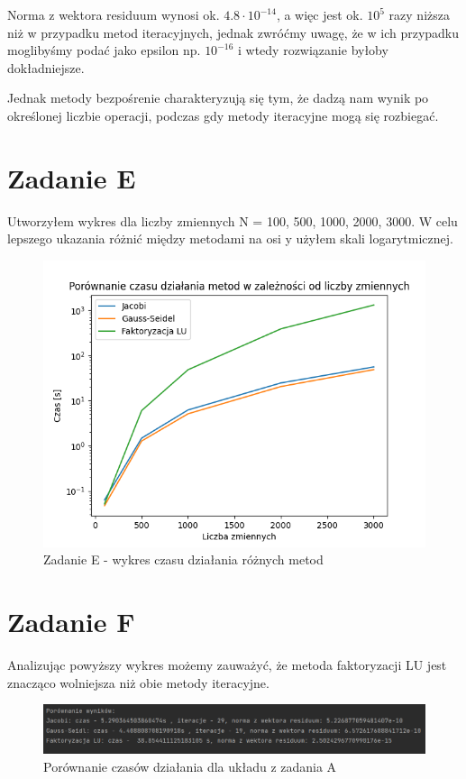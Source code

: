 \documentclass[fleqn]{article}
\begin{document}
    \noindent Norma z wektora residuum wynosi ok. $4.8 \cdot 10^{-14} $, 
    a więc jest ok. $10^5 $ razy niższa niż w przypadku metod iteracyjnych, jednak zwróćmy uwagę,
    że w ich przypadku moglibyśmy podać jako epsilon np. $10^{-16}$ i wtedy rozwiązanie byłoby dokładniejsze.
    
    \noindent Jednak metody bezpośrenie charakteryzują się tym, że dadzą nam wynik po określonej liczbie operacji,
    podczas gdy metody iteracyjne mogą się rozbiegać.
    \newpage
    \section{Zadanie E}
    Utworzyłem wykres dla liczby zmiennych N = {100, 500, 1000, 2000, 3000}.
    W celu lepszego ukazania różnić między metodami na osi y użyłem skali logarytmicznej.


    \begin{figure}[h]

        \centering
        \includegraphics[width=\textwidth]{test.png}
        \centering
        \caption{Zadanie E - wykres czasu działania różnych metod}

    \end{figure}
    \newpage
    \section{Zadanie F}
    Analizując powyższy wykres możemy zauważyć, że metoda faktoryzacji LU jest znacząco wolniejsza
    niż obie metody iteracyjne.
    \begin{figure}[h]

        \centering
        \includegraphics[width=\textwidth]{LUJacGS.png}
        \centering
        \caption{Porównanie czasów działania dla układu z zadania A}

    \end{figure}
\end{document}
